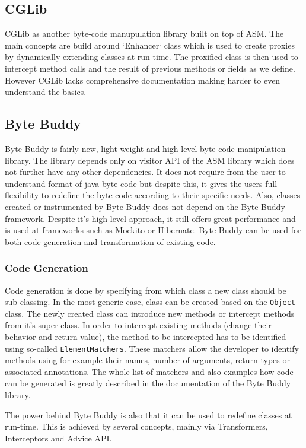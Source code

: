 \subsection{CGLib}
\label{cglib}
CGLib as another byte-code manupulation library built on top of ASM. The main concepts are build around `Enhancer` class which is used to create proxies by dynamically extending classes at run-time. The proxified class is then used to intercept method calls and the result of previous methods or fields as we define. However CGLib lacks comprehensive documentation making harder to even understand the basics.

\subsection{Byte Buddy}
\label{sec:byte_buddy}
Byte Buddy is fairly new, light-weight and high-level byte code manipulation library. The library depends only on visitor API of the ASM library which does not further have any other dependencies. It does not require from the user to understand format of java byte code but despite this, it gives the users full flexibility to redefine the byte code according to their specific needs. Also, classes created or instrumented by Byte Buddy does not depend on the Byte Buddy framework. Despite it's high-level approach, it still offers great performance and is used at frameworks such as Mockito or Hibernate. Byte Buddy can be used for both code generation and transformation of existing code.

\subsubsection{Code Generation}
Code generation is done by specifying from which class a new class should be sub-classing. In the most generic case, class can be created based on the \texttt{Object} class. The newly created class can introduce new methods or intercept methods from it's super class. In order to intercept existing methods (change their behavior and return value), the method to be intercepted has to be identified using so-called \texttt{ElementMatchers}. These matchers allow the developer to identify methods using for example their names, number of arguments, return types or associated annotations. The whole list of matchers and also examples how code can be generated is greatly described in the documentation of the Byte Buddy library.

The power behind Byte Buddy is also that it can be used to redefine classes at run-time. This is achieved by several concepts, mainly via Transformers, Interceptors and Advice API.
